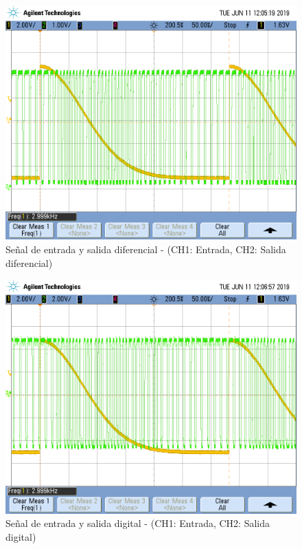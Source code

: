 \documentclass[assd_tp3_main.tex]{subfiles}
\begin{document}
\begin{figure}[!ht]
\begin{centering}
\includegraphics[scale=0.25]{../EJ4/Mediciones/0.5Gauss/s2_2.png}
\par\end{centering}
\caption{Señal de entrada y salida diferencial - (CH1: Entrada, CH2: Salida diferencial)}
\end{figure}


\begin{figure}[!ht]
\begin{centering}
\includegraphics[scale=0.25]{../EJ4/Mediciones/0.5Gauss/s2_3.png}
\par\end{centering}
\caption{Señal de entrada y salida digital - (CH1: Entrada, CH2: Salida digital)}
\end{figure}
\end{document}
